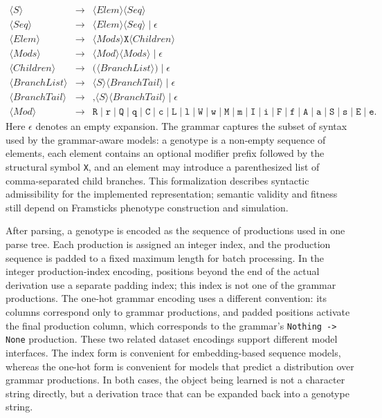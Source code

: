 \[
\begin{array}{rcl}
\langle S\rangle
&\rightarrow&
\langle Elem\rangle \langle Seq\rangle \\

\langle Seq\rangle
&\rightarrow&
\langle Elem\rangle \langle Seq\rangle
\mid \epsilon \\

\langle Elem\rangle
&\rightarrow&
\langle Mods\rangle \texttt{X} \langle Children\rangle \\

\langle Mods\rangle
&\rightarrow&
\langle Mod\rangle \langle Mods\rangle
\mid \epsilon \\

\langle Children\rangle
&\rightarrow&
\texttt{(}\langle BranchList\rangle\texttt{)}
\mid \epsilon \\

\langle BranchList\rangle
&\rightarrow&
\langle S\rangle \langle BranchTail\rangle
\mid \epsilon \\

\langle BranchTail\rangle
&\rightarrow&
\texttt{,}\langle S\rangle \langle BranchTail\rangle
\mid \epsilon \\

\langle Mod\rangle
&\rightarrow&
\texttt{R}\mid\texttt{r}\mid
\texttt{Q}\mid\texttt{q}\mid
\texttt{C}\mid\texttt{c}\mid
\texttt{L}\mid\texttt{l}\mid
\texttt{W}\mid\texttt{w}\mid
\texttt{M}\mid\texttt{m}\mid
\texttt{I}\mid\texttt{i}\mid
\texttt{F}\mid\texttt{f}\mid
\texttt{A}\mid\texttt{a}\mid
\texttt{S}\mid\texttt{s}\mid
\texttt{E}\mid\texttt{e}.
\end{array}
\]
Here \(\epsilon\) denotes an empty expansion. The grammar captures the subset of \fone{} syntax used by the grammar-aware models: a genotype is a non-empty sequence of elements, each element contains an optional modifier prefix followed by the structural symbol \texttt{X}, and an element may introduce a parenthesized list of comma-separated child branches. This formalization describes syntactic admissibility for the implemented representation; semantic validity and fitness still depend on Framsticks phenotype construction and simulation.


After parsing, a genotype is encoded as the sequence of productions used in one parse tree. Each production is assigned an integer index, and the production sequence is padded to a fixed maximum length for batch processing. In the integer production-index encoding, positions beyond the end of the actual derivation use a separate padding index; this index is not one of the grammar productions. The one-hot grammar encoding uses a different convention: its columns correspond only to grammar productions, and padded positions activate the final production column, which corresponds to the grammar's \texttt{Nothing -> None} production. These two related dataset encodings support different model interfaces. The index form is convenient for embedding-based sequence models, whereas the one-hot form is convenient for models that predict a distribution over grammar productions. In both cases, the object being learned is not a character string directly, but a derivation trace that can be expanded back into a genotype string.

